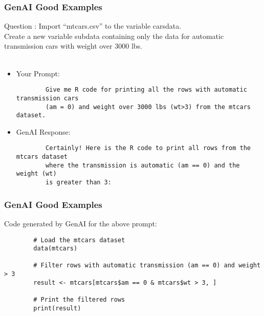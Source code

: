\documentclass[slidestop,compress,mathserif]{beamer}
\begin{document}

\begin{frame}[fragile]
	\frametitle{GenAI Good Examples}
	Question : Import ``mtcars.csv'' to the variable carsdata. \\
	Create a new variable subdata containing only the data for automatic transmission cars with weight over 3000 lbs. \\ \\
	
	\begin{itemize}
	\item Your Prompt:
	\begin{scriptsize}
	\begin{verbatim}
		Give me R code for printing all the rows with automatic transmission cars 
		(am = 0) and weight over 3000 lbs (wt>3) from the mtcars dataset.
	\end{verbatim}
	\end{scriptsize}
	\item GenAI Response:
	
	\begin{scriptsize}
		\begin{verbatim}
		Certainly! Here is the R code to print all rows from the mtcars dataset 
		where the transmission is automatic (am == 0) and the weight (wt) 
		is greater than 3:

		\end{verbatim}
	\end{scriptsize}
\end{itemize}
\end{frame}



\begin{frame}[fragile]
	\frametitle{GenAI Good Examples}	
		Code generated by GenAI for the above prompt:
	\begin{scriptsize}
		\begin{verbatim}
		# Load the mtcars dataset
		data(mtcars)

		# Filter rows with automatic transmission (am == 0) and weight > 3
		result <- mtcars[mtcars$am == 0 & mtcars$wt > 3, ]

		# Print the filtered rows
		print(result)

		\end{verbatim}
	\end{scriptsize}
\end{frame}
\end{document}
